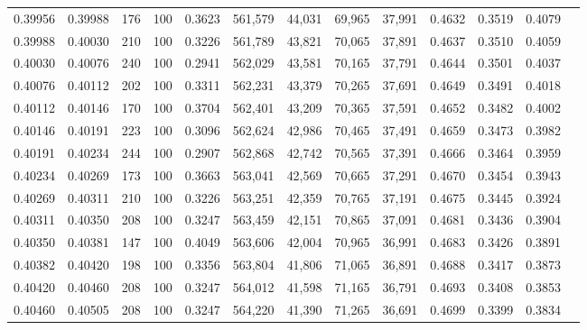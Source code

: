 \begin{tabular}{rrrrrrrrrrrrr}
0.39956 & 0.39988 &   176 & 100 &                                     0.3623 & 561,579 &  44,031 &  69,965 &  37,991 & 0.4632 & 0.3519 & 0.4079 \\
0.39988 & 0.40030 &   210 & 100 &                                     0.3226 & 561,789 &  43,821 &  70,065 &  37,891 & 0.4637 & 0.3510 & 0.4059 \\
0.40030 & 0.40076 &   240 & 100 &                                     0.2941 & 562,029 &  43,581 &  70,165 &  37,791 & 0.4644 & 0.3501 & 0.4037 \\
0.40076 & 0.40112 &   202 & 100 &                                     0.3311 & 562,231 &  43,379 &  70,265 &  37,691 & 0.4649 & 0.3491 & 0.4018 \\
0.40112 & 0.40146 &   170 & 100 &                                     0.3704 & 562,401 &  43,209 &  70,365 &  37,591 & 0.4652 & 0.3482 & 0.4002 \\
0.40146 & 0.40191 &   223 & 100 &                                     0.3096 & 562,624 &  42,986 &  70,465 &  37,491 & 0.4659 & 0.3473 & 0.3982 \\
0.40191 & 0.40234 &   244 & 100 &                                     0.2907 & 562,868 &  42,742 &  70,565 &  37,391 & 0.4666 & 0.3464 & 0.3959 \\
0.40234 & 0.40269 &   173 & 100 &                                     0.3663 & 563,041 &  42,569 &  70,665 &  37,291 & 0.4670 & 0.3454 & 0.3943 \\
0.40269 & 0.40311 &   210 & 100 &                                     0.3226 & 563,251 &  42,359 &  70,765 &  37,191 & 0.4675 & 0.3445 & 0.3924 \\
0.40311 & 0.40350 &   208 & 100 &                                     0.3247 & 563,459 &  42,151 &  70,865 &  37,091 & 0.4681 & 0.3436 & 0.3904 \\
0.40350 & 0.40381 &   147 & 100 &                                     0.4049 & 563,606 &  42,004 &  70,965 &  36,991 & 0.4683 & 0.3426 & 0.3891 \\
0.40382 & 0.40420 &   198 & 100 &                                     0.3356 & 563,804 &  41,806 &  71,065 &  36,891 & 0.4688 & 0.3417 & 0.3873 \\
0.40420 & 0.40460 &   208 & 100 &                                     0.3247 & 564,012 &  41,598 &  71,165 &  36,791 & 0.4693 & 0.3408 & 0.3853 \\
0.40460 & 0.40505 &   208 & 100 &                                     0.3247 & 564,220 &  41,390 &  71,265 &  36,691 & 0.4699 & 0.3399 & 0.3834 \\

\end{tabular}
